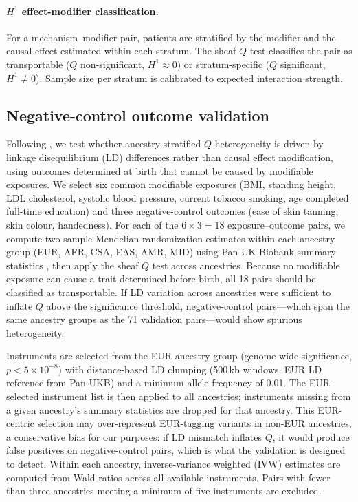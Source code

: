 \documentclass[11pt]{article}
\begin{document}
\paragraph{\texorpdfstring{$H^1$}{H1} effect-modifier classification.}
For a mechanism--modifier pair, patients are stratified by the modifier and the causal effect estimated within each stratum.
The sheaf $Q$ test classifies the pair as transportable ($Q$ non-significant, $H^1 \approx 0$) or stratum-specific ($Q$ significant, $H^1 \neq 0$).
Sample size per stratum is calibrated to expected interaction strength.

\subsection{Negative-control outcome validation}
\label{sec:meth-negative-control}

Following \citet{sanderson2021negative}, we test whether ancestry-stratified $Q$ heterogeneity is driven by linkage disequilibrium (LD) differences rather than causal effect modification, using outcomes determined at birth that cannot be caused by modifiable exposures.
We select six common modifiable exposures (BMI, standing height, LDL cholesterol, systolic blood pressure, current tobacco smoking, age completed full-time education) and three negative-control outcomes (ease of skin tanning, skin colour, handedness).
For each of the $6 \times 3 = 18$ exposure--outcome pairs, we compute two-sample Mendelian randomization estimates within each ancestry group (EUR, AFR, CSA, EAS, AMR, MID) using Pan-UK Biobank summary statistics \citep{karczewski2025panukb}, then apply the sheaf $Q$ test across ancestries.
Because no modifiable exposure can cause a trait determined before birth, all 18 pairs should be classified as transportable.
If LD variation across ancestries were sufficient to inflate $Q$ above the significance threshold, negative-control pairs---which span the same ancestry groups as the 71 validation pairs---would show spurious heterogeneity.

Instruments are selected from the EUR ancestry group (genome-wide significance, $p < 5 \times 10^{-8}$) with distance-based LD clumping (500\,kb windows, EUR LD reference from Pan-UKB) and a minimum allele frequency of 0.01.
The EUR-selected instrument list is then applied to all ancestries; instruments missing from a given ancestry's summary statistics are dropped for that ancestry.
This EUR-centric selection may over-represent EUR-tagging variants in non-EUR ancestries, a conservative bias for our purposes: if LD mismatch inflates $Q$, it would produce false positives on negative-control pairs, which is what the validation is designed to detect.
Within each ancestry, inverse-variance weighted (IVW) estimates are computed from Wald ratios across all available instruments.
Pairs with fewer than three ancestries meeting a minimum of five instruments are excluded.
\end{document}
